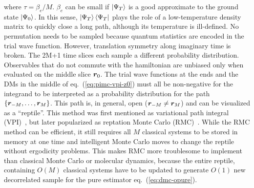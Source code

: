 where $\tau=\beta_e/M$. $\beta_e$ can be small if $\ket{\Psi_T}$ is a good approximate to the ground state $\ket{\Psi_0}$. In this sense, $\ket{\Psi_T}\bra{\Psi_T}$ plays the role of a low-temperature density matrix to quickly close a long path, although its temperature is ill-defined. No permutation needs to be sampled because quantum statistics are encoded in the trial wave function. However, translation symmetry along imaginary time is broken. The 2M+1 time slices each sample a different probability distribution. Observables that do not commute with the hamiltonian are unbiased only when evaluated on the middle slice $\boldsymbol{r}_0$. The trial wave functions at the ends and the DMs in the middle of eq.~(\ref{eq:pimc-vpi-z0}) must all be non-negative for the integrand to be interpreted as a probability distribution for the path $\{\boldsymbol{r}_{-M},\dots,\boldsymbol{r}_M\}$. This path is, in general, open ($\boldsymbol{r}_{-M}\neq\boldsymbol{r}_M$) and can be visualized as a ``reptile''. This method was first mentioned as variational path integral (VPI)~\cite{Ceperley1995}, but later popularized as reptation Monte Carlo (RMC)~\cite{Baroni1999}. While the RMC method can be efficient, it still requires all $M$ classical systems to be stored in memory at one time and intelligent Monte Carlo moves to change the reptile without ergodicity problems. This makes RMC more troublesome to implement than classical Monte Carlo or molecular dynamics, because the entire reptile, containing $O(M)$ classical systems have to be updated to generate $O(1)$ new decorrelated sample for the pure estimator eq.~(\ref{eq:dmc-opure}).

